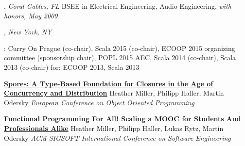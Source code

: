 \documentclass[9pt]{article}
\begin{document}
, \emph{Coral Gables, FL} \vspace{0.01in}  
\newline\noindent BSEE in Electrical Engineering, Audio Engineering, {\em with honors, May 2009}
\bigskip

, \emph{New York, NY} \vspace{0.01in}  
\bigskip


\vspace{-0.02in}
: Curry On Prague (co-chair), Scala 2015 (co-chair), ECOOP 2015 organizing committee (sponsorship chair), POPL 2015 AEC, Scala 2014 (co-chair), Scala 2013 (co-chair)
\newline{} for: ECOOP 2013, Scala 2013

\bigskip



\noindent\href{http://infoscience.epfl.ch/record/191239}{\bf Spores: A Type-Based Foundation for Closures in the Age of}\vspace{-0.03in}
\newline\noindent\href{http://infoscience.epfl.ch/record/191239}{\bf Concurrency and Distribution}
\newline\noindent Heather Miller, Philipp Haller, Martin Odersky
\newline\noindent\emph{European Conference on Object Oriented Programming}
\bigskip

\noindent\href{http://infoscience.epfl.ch/record/190022}{\bf Functional Programming For All! Scaling a MOOC for Students}\vspace{-0.03in}
\newline\noindent\href{http://infoscience.epfl.ch/record/190022}{\bf And Professionals Alike}
\newline\noindent Heather Miller, Philipp Haller, Lukas Rytz, Martin Odersky
\newline\noindent\emph{ACM SIGSOFT International Conference on Software Engineering}
\bigskip
\end{document}
